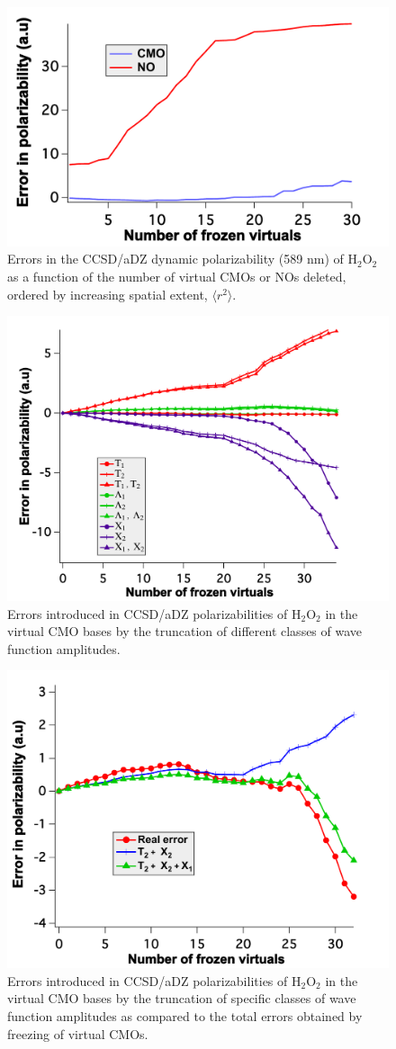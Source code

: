 \begin{figure}
  \centering
  \includegraphics[width=0.6\linewidth]{figures/sort_spatial.pdf}
  \caption{Errors in the CCSD/aDZ dynamic polarizability (589
nm) of H$_2$O$_2$ as a function of the number of virtual CMOs or NOs deleted,
ordered by increasing spatial extent, $\langle r^2 \rangle$.}
   \label{fig:sort_spatial}
\end{figure}
\begin{figure}
  \centering
  \includegraphics[width=0.6\linewidth]{figures/amp_trunc_cmo.pdf}
  \caption{Errors introduced in CCSD/aDZ polarizabilities of
H$_2$O$_2$ in the virtual CMO bases by the truncation of different classes of wave
function amplitudes.}
   \label{fig:amp_trunc_cmo}
\end{figure}
\begin{figure}
  \centering
  \includegraphics[width=0.6\linewidth]{figures/error_cmpare.pdf}
  \caption{Errors introduced in CCSD/aDZ polarizabilities of
H$_2$O$_2$ in the virtual CMO bases by the truncation of specific classes of wave
function amplitudes as compared to the total errors obtained by freezing of
virtual CMOs.}
   \label{fig:error_cmpare}
\end{figure}
